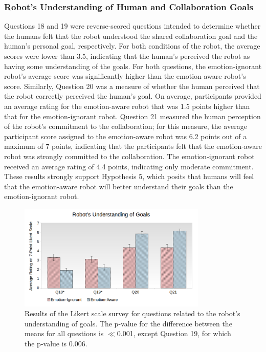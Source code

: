 \documentclass[12pt]{report}
\begin{document}
\subsubsection{Robot's Understanding of Human and Collaboration Goals}
\label{sec:Goals}
Questions 18 and 19 were reverse-scored questions intended to determine whether
the humans felt that the robot understood the shared collaboration goal and the
human's personal goal, respectively. For both conditions of the robot, the
average scores were lower than 3.5, indicating that the human's perceived the
robot as having some understanding of the goals. For both questions, the
emotion-ignorant robot's average score was significantly higher than the
emotion-aware robot's score. Similarly, Question 20 was a measure of whether the
human perceived that the robot correctly perceived the human's goal.
On average, participants provided an average rating for the emotion-aware robot
that was 1.5 points higher than that for the emotion-ignorant robot. Question 21
measured the human perception of the robot's commitment to the collaboration;
for this measure, the average participant score assigned to the emotion-aware
robot was 6.2 points out of a maximum of 7 points, indicating that the
participants felt that the emotion-aware robot was strongly committed to the
collaboration. The emotion-ignorant robot received an average rating of 4.4
points, indicating only moderate commitment. These results strongly support
Hypothesis 5, which posits that humans will feel that the emotion-aware robot
will better understand their goals than the emotion-ignorant robot.

\begin{figure}
\centering
\includegraphics[width=0.8\textwidth]{figure/Overall-Goals.png}
\caption{\fontsize{10}{10}\selectfont Results of the Likert scale survey for
questions related to the robot's understanding of goals. The p-value for the
difference between the means for all questions is $\ll$0.001, except Question
19, for which the p-value is 0.006.}
\label{fig:overall-goals}
\end{figure}
\end{document}
